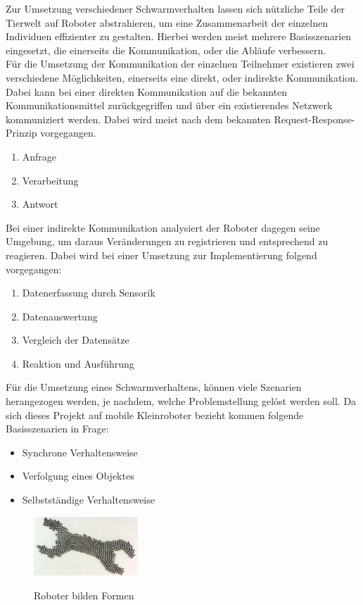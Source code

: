 Zur Umsetzung verschiedener Schwarmverhalten lassen sich nützliche Teile der Tierwelt auf Roboter abstrahieren, um eine Zusammenarbeit der einzelnen Individuen effizienter zu gestalten. Hierbei werden meist mehrere Basisszenarien eingesetzt, die einerseits die Kommunikation, oder die Abläufe verbessern.\\
Für die Umsetzung der Kommunikation der einzelnen Teilnehmer existieren zwei verschiedene Möglichkeiten, einerseits eine direkt, oder indirekte Kommunikation. Dabei kann bei einer direkten Kommunikation auf die bekannten Kommunikationsmittel zurückgegriffen und über ein existierendes Netzwerk kommuniziert werden. Dabei wird meist nach dem bekannten Request-Response-Prinzip vorgegangen.
\begin{enumerate}
	\item Anfrage
	\item Verarbeitung
	\item Antwort
\end{enumerate}
Bei einer indirekte Kommunikation analysiert der Roboter dagegen seine Umgebung, um daraus Veränderungen zu registrieren und entsprechend zu reagieren. Dabei wird bei einer Umsetzung zur Implementierung folgend vorgegangen:
\begin{enumerate}
	\item Datenerfassung durch Sensorik
	\item Datenauswertung
	\item Vergleich der Datensätze
	\item Reaktion und Ausführung
\end{enumerate}
Für die Umsetzung eines Schwarmverhaltens, können viele Szenarien herangezogen werden, je nachdem, welche Problemstellung gelöst werden soll. Da sich dieses Projekt auf mobile Kleinroboter bezieht kommen folgende Basisszenarien in Frage:
\begin{itemize}
	\item Synchrone Verhaltensweise
	\item Verfolgung eines Objektes
	\item Selbstständige Verhaltensweise
\end{itemize}

\begin{figure}
	\begin{center}
		\includegraphics[width=0.35\textwidth]{images/technische_grundlagen/roboterform.jpg}
	\end{center}
	\caption{Roboter bilden Formen}
	\cite{FrankfurterAllgemeineZeitungGmbH.Schwarmverhalten:Roboter}
	\label{fig:roboterFormen}
\end{figure}

